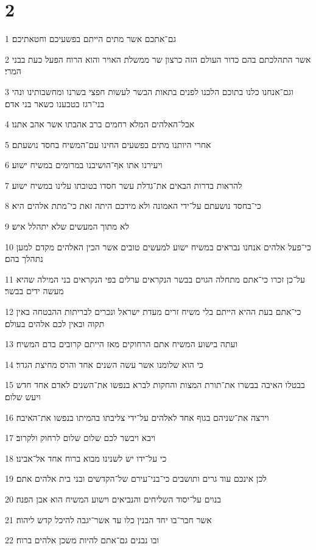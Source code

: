 \chapter{2}

\par 1 גם־אתכם אשר מתים הייתם בפשעיכם וחטאתיכם׃
\par 2 אשר התהלכתם בהם כדור העולם הזה כרצון שר ממשלת האויר והוא הרוח הפעל כעת בבני המרי׃
\par 3 וגם־אנחנו כלנו בתוכם הלכנו לפנים בתאות הבשר לעשות חפצי בשרנו ומחשבותינו ונהי בני־רגז בטבענו כשאר בני אדם׃
\par 4 אבל־האלהים המלא רחמים ברב אהבתו אשר אהב אתנו׃
\par 5 אחרי היותנו מתים בפשעים החינו עם־המשיח בחסד נושעתם׃
\par 6 ויעירנו אתו אף־הושיבנו במרומים במשיח ישוע׃
\par 7 להראות בדרות הבאים את־גדלת עשר חסדו בטובתו עלינו במשיח ישוע׃
\par 8 כי־בחסד נושעתם על־ידי האמונה ולא מידכם היתה זאת כי־מתת אלהים היא׃
\par 9 לא מתוך המעשים שלא יתהלל איש׃
\par 10 כי־פעל אלהים אנחנו נבראים במשיח ישוע למעשים טובים אשר הכין האלהים מקדם למען נתהלך בהם׃
\par 11 על־כן זכרו כי־אתם מתחלה הגוים בבשר הנקראים ערלים בפי הנקראים בני המילה שהיא מעשה ידים בבשר׃
\par 12 כי־אתם בעת ההיא הייתם בלי משיח זרים מעדת ישראל ונכרים לבריתות ההבטחה באין תקוה ובאין לכם אלהים בעולם׃
\par 13 ועתה בישוע המשיח אתם הרחוקים מאז הייתם קרובים בדם המשיח׃
\par 14 כי הוא שלומנו אשר עשה השנים אחד והרס מחיצת הגדר׃
\par 15 בבטלו האיבה בבשרו את־תורת המצות והחקות לברא בנפשו את־השנים לאדם אחד חדש ויעש שלום׃
\par 16 וירצה את־שניהם בגוף אחד לאלהים על־ידי צליבתו בהמיתו בנפשו את־האיבה׃
\par 17 ויבא ויבשר לכם שלום שלום לרחוק ולקרוב׃
\par 18 כי על־ידו יש לשנינו מבוא ברוח אחד אל־אבינו׃
\par 19 לכן אינכם עוד גרים ותושבים כי־בני־עירם של־הקדשים ובני בית אלהים אתם׃
\par 20 בנוים על־יסוד השליחים והנביאים וישוע המשיח הוא אבן הפנה׃
\par 21 אשר חבר־בו יחד הבנין כלו עד אשר־יגבה להיכל קדש ליהוה׃
\par 22 ובו נבנים גם־אתם להיות משכן אלהים ברוח׃

